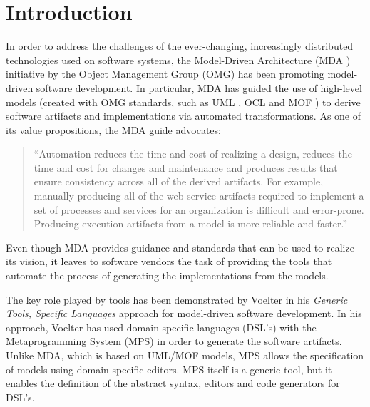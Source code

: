\section{Introduction}
%
In order to address the challenges of the ever-changing, increasingly distributed technologies used on software systems, the Model-Driven Architecture (MDA \cite{mda}) initiative by the Object Management Group (OMG) has been promoting model-driven software development.
In particular, MDA has guided the use of high-level models (created with OMG standards, such as UML \cite{uml}, OCL \cite{ocl} and MOF \cite{mof}) to derive software artifacts and implementations via automated transformations.
As one of its value propositions, the MDA guide \cite{mda} advocates:
\begin{quote}``Automation reduces the time and cost of realizing a design, reduces the time and cost for changes and maintenance and produces results that ensure consistency across all of the derived artifacts. For example, manually producing all of the web service artifacts required to implement a set of processes and services for an organization is difficult and error-prone. Producing execution artifacts from a model is more reliable and faster.''\end{quote} 

Even though MDA provides guidance and standards that can be used to realize its vision, it leaves to software vendors the task of providing the tools that automate the process of generating the implementations from the models.

The key role played by tools has been demonstrated by Voelter \cite{voelter} in his \emph{Generic Tools, Specific Languages} approach for model-driven software development. In his approach, Voelter \cite{voelter} has used domain-specific languages (DSL's) with the Metaprogramming System (MPS) in order to generate the software artifacts.
Unlike MDA, which is based on UML/MOF models, MPS allows the specification of models using domain-specific editors.
MPS itself is a generic tool, but it enables the definition of the abstract syntax, editors and code generators for DSL's.
